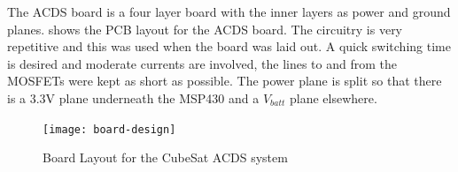 The \ac{ACDS} board is a four layer board with the inner layers as power and ground planes.  shows the \ac{PCB} layout for the \ac{ACDS} board. The circuitry is very repetitive and this was used when the board was laid out. A quick switching time is desired and moderate currents are involved, the lines to and from the \acp{MOSFET} were kept as short as possible. The power plane is split so that there is a 3.3V plane underneath the MSP430 and a $V_{batt}$ plane elsewhere.

\begin{figure}[H]
    \centering
    \texttt{[image: board-design]}
    \caption{Board Layout for the CubeSat \acs{ACDS} system}
    \label{fig:layout}
\end{figure}

